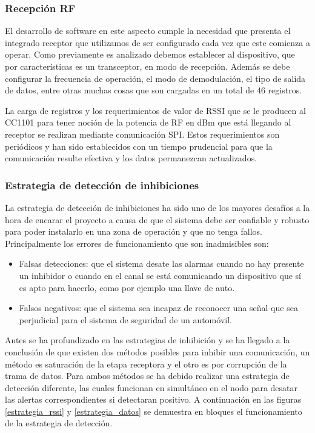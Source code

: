 \subsubsection{Recepción RF}

El desarrollo de software en este aspecto cumple la necesidad que presenta el integrado receptor que utilizamos de ser 
configurado cada vez que este comienza a operar. Como previamente es analizado debemos establecer al dispositivo, que por
características es un transceptor, en modo de recepción. Además se debe configurar la frecuencia de operación, el modo de 
demodulación, el tipo de salida de datos, entre otras muchas cosas que son cargadas en un total de 46 registros. \par 
La carga de registros y los requerimientos de valor de RSSI que se le producen al CC1101 para tener noción de la potencia 
de RF en dBm que está llegando al receptor se realizan mediante comunicación SPI. Estos requerimientos son periódicos y 
han sido establecidos con un tiempo prudencial para que la comunicación resulte efectiva y los datos permanezcan actualizados.

\subsubsection{Estrategia de detección de inhibiciones}

La estrategia de detección de inhibiciones ha sido uno de los mayores desafíos a la hora de encarar el proyecto a causa de que
el sistema debe ser confiable y robusto para poder instalarlo en una zona de operación y que no tenga fallos. Principalmente
los errores de funcionamiento que son inadmisibles son: 
\begin{itemize}
	\item Falsas detecciones: que el sistema desate las alarmas cuando no hay presente un inhibidor o cuando en el canal se está
	comunicando un dispositivo que sí es apto para hacerlo, como por ejemplo una llave de auto.
	\item Falsos negativos: que el sistema sea incapaz de reconocer una señal que sea perjudicial para el sistema de seguridad
	de un automóvil.
\end{itemize} 

Antes se ha profundizado en las estrategias de inhibición y se ha llegado a la conclusión de que existen dos métodos posibles
para inhibir una comunicación, un método es saturación de la etapa receptora y el otro es por corrupción de la trama de datos.
Para ambos métodos se ha debido realizar una estrategia de detección diferente, las cuales funcionan en simultáneo en el nodo
para desatar las alertas correspondientes si detectaran positivo. A continuación en las figuras \ref{estrategia_rssi} 
y \ref{estrategia_datos} se demuestra en bloques el funcionamiento de la estrategia de detección.

